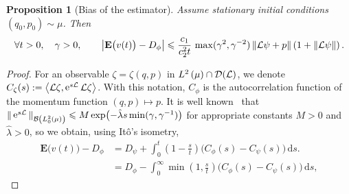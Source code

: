 \documentclass[11pt,a4paper]{article}
\DeclareMathOperator{\e}{e}
\newcommand{\expect}[0]{\mathbf{E}}
\renewcommand{\d}{\mathrm d}
\theoremstyle{plain}
\newtheorem{proposition}{Proposition}[section]
\numberwithin{equation}{section}
\renewcommand{\leq}{\leqslant}
\begin{document}
\begin{proposition}
    [Bias of the estimator]
    Assume stationary initial conditions $(q_0, p_0) \sim \mu$.
    Then
    \begin{align*}
        \forall t > 0, \quad \gamma > 0, \qquad
        \abs{\expect \bigl( v(t) \bigr) - D_{\phi}}
        \leq \frac{c_1}{c_2^2 t} \, \max(\gamma^2, \gamma^{-2}) \norm{\mathcal L\psi + p}  \left(1 + \norm{\mathcal L \psi} \right).
    \end{align*}
\end{proposition}
\begin{proof}
    For an observable $\zeta = \zeta(q, p)$ in $\lp{2}{\mu} \cap \mathcal D(\mathcal L)$,
    we denote $C_{\zeta}(s) := \ip{\mathcal L \zeta}{\e^{s \mathcal L} \mathcal L \zeta}$.
    With this notation, $C_{\phi}$ is the autocorrelation function of the momentum function $(q, p) \mapsto p$.
    It is well known~\cite{roussel2018spectral} that $\norm*{ \e^{s \mathcal L} }[\mathcal B \left(L^2_0\left(\mu\right) \right)] \leq M \exp \bigl(- \hat \lambda s \min(\gamma, \gamma^{-1}) \bigr)$
    for appropriate constants $M > 0$ and $\hat \lambda > 0$,
    so we obtain, using It\^o's isometry,
    \begin{align*}
        \expect \bigl(v(t)\bigr) - D_{\phi}
        &= D_{\psi} + \int_{0}^{t} \left(1 - \frac{s}{t}\right) \bigl( C_{\phi}(s) - C_{\psi}(s) \bigr) \, \d s. \\
        &= D_{\phi} - \int_{0}^{\infty} \min\left(1, \frac{s}{t}\right) \bigl( C_{\phi}(s) - C_{\psi}(s) \bigr) \, \d s,
    \end{align*}


\end{proof}
\end{document}
